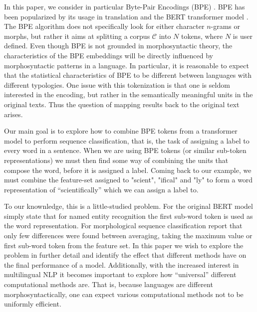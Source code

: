 \documentclass[11pt]{article}
\newcommand\citet{\newcite}
\newcommand\citep{\cite}
\begin{document}
    In this paper, we consider in particular
     Byte-Pair Encodings (BPE) \citep{sennrich2015neural}.
     BPE has been popularized by its usage in translation and the BERT transformer model \citep{devlin2018bert}.
     The BPE algorithm does not specifically look for either
     character $n$-grams or morphs, but rather it aims at splitting a
     corpus $\mathcal{C}$ into $N$ tokens, where $N$ is user defined.
    Even though BPE is not grounded in morphosyntactic theory, the
     characteristics of the BPE embeddings will be directly influenced
     by morphosyntactic patterns in a language. In particular, it is
     reasonable to expect that the statistical characteristics of BPE
     to be different between languages with different typologies.
        One issue with this tokenization is that one is seldom
     interested in the encoding, but rather in the semantically
     meaningful units in the original texts.  Thus the question of
     mapping results back to the original text arises.

                        Our main goal is to explore how to combine BPE
     tokens from a transformer model to perform sequence
     classification, that is, the task of assigning a label to every
     word in a sentence. When we are using BPE tokens (or similar
     sub-token representations) we must then find some way of
     combining the units that compose the word, before it is assigned
     a label.  Coming back to our example, we must combine the
     feature-set assigned to "scient", "ifical" and "ly" to form a
     word representation of ``scientifically'' which we can assign a
     label to.


                    	To our knownledge, this is a little-studied
     problem. For the original BERT model \citet{devlin2018bert}
     simply state that for named entity recognition the first sub-word
     token is used as the word representation.  For
     morphological sequence classification \citet{kondratyuk2019cross}
     report that only few differences were found between averaging,
     taking the maximum value or first sub-word token from the feature
     set.  In this paper we wish to explore the problem in further
     detail and identify the effect that different methods have on the
     final performance of a model.
                 Additionally, with the increased interest in
     multilingual NLP it becomes important to explore how
     ``universal'' different computational methods are.  That is,
     because languages are different morphosyntactically, one can
     expect various computational methods not to be uniformly
     efficient. 
\end{document}
